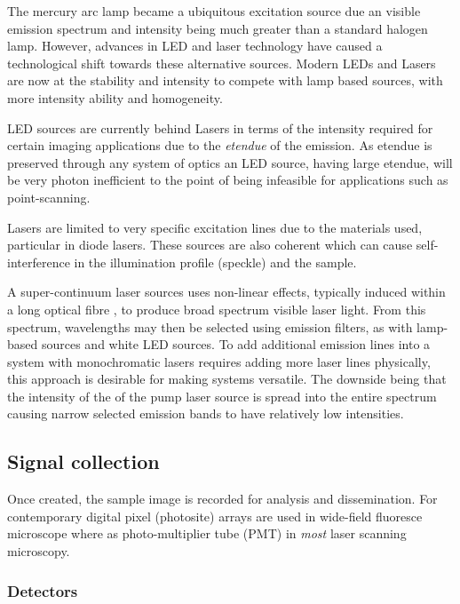 The mercury arc lamp became a ubiquitous excitation source due an visible emission spectrum and intensity being much greater than a standard halogen lamp.
However, advances in LED and laser technology have caused a technological shift towards these alternative sources.
Modern LEDs and Lasers are now at the stability and intensity to compete with lamp based sources, with more intensity ability and homogeneity.

LED sources are currently behind Lasers in terms of the intensity required for certain imaging applications due to the \emph{etendue} of the emission.
As etendue is preserved through any system of optics an LED source, having large etendue, will be very photon inefficient to the point of being infeasible for applications such as point-scanning.

Lasers are limited to very specific excitation lines due to the materials used, particular in diode lasers.
These sources are also coherent which can cause self-interference in the illumination profile (speckle) and the sample.

A super-continuum laser sources uses non-linear effects, typically induced within a long optical fibre , to produce broad spectrum visible laser light.
From this spectrum, wavelengths may then be selected using emission filters, as with lamp-based sources and white LED sources.
To add additional emission lines into a system with monochromatic lasers requires adding more laser lines physically, this approach is desirable for making systems versatile.
The downside being that the intensity of the of the pump laser source is spread into the entire spectrum causing narrow selected emission bands to have relatively low intensities.


\subsection{Signal collection}

Once created, the sample image is recorded for analysis and dissemination.
For contemporary digital pixel (photosite) arrays are used in wide-field fluoresce microscope where as photo-multiplier tube (PMT) in \emph{most} laser scanning microscopy.

\subsubsection{Detectors}

